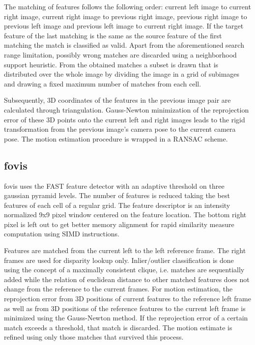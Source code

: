 \documentclass[conference]{IEEEtran}
\begin{document}
The matching of features follows the following order: current left image to current right image, current right image to previous right image, previous right image to previous left image and previous left image to current right image. If the target feature of the last matching is the same as the source feature of the first matching the match is classified as valid. Apart from the aforementioned search range limitation, possibly wrong matches are discarded using a neighborhood support heuristic.
From the obtained matches a subset is drawn that is distributed over the whole image by dividing the image in a grid of subimages and drawing a fixed maximum number of matches from each cell.

Subsequently, 3D coordinates of the features in the previous image pair are calculated through triangulation. Gauss-Newton minimization of the reprojection error of these 3D points onto the current left and right images leads to the rigid transformation from the previous image's camera pose to the current camera pose. The motion estimation procedure is wrapped in a RANSAC \cite{Fischler1981} scheme.


\subsection{fovis
  \label{fovis}
}

fovis uses the FAST feature detector \cite{Rosten2005FPA,Rosten2006} with an adaptive threshold on three gaussian pyramid levels. The number of features is reduced taking the best features of each cell of a regular grid. The feature descriptor is an intensity normalized 9x9 pixel window centered on the feature location. The bottom right pixel is left out to get better memory alignment for rapid similarity measure computation using SIMD instructions.

Features are matched from the current left to the left reference frame. The right frames are used for disparity lookup only. Inlier/outlier classification is done using the concept of a maximally consistent clique, i.e. matches are sequentially added while the relation of euclidean distance to other matched features does not change from the reference to the current frames. For motion estimation, the reprojection error from 3D positions of current features to the reference left frame as well as from 3D positions of the reference features to the current left frame is minimized using the Gauss-Newton method. If the reprojection error of a certain match exceeds a threshold, that match is discarded. The motion estimate is refined using only those matches that survived this process.
\end{document}
